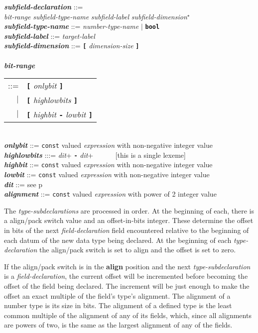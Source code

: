 \documentclass[12pt]{article}
\newcommand{\TT}[1]{{\tt \bfseries #1}}
\newcommand{\STAR}{{\Large $^\star$}}
\newcommand{\key}[1]{{\rm \bfseries #1}}
\newcommand{\emkey}[1]{{\em \bfseries #1}}
\newcommand{\pagref}[1]{p\pageref{#1}}
\newenvironment{indpar}[1][0.3in]%
	{\begin{list}{}%
		     {\setlength{\itemsep}{0in}%
		      \setlength{\topsep}{0in}%
		      \setlength{\parsep}{1ex}%
		      \setlength{\labelwidth}{#1}%
		      \setlength{\leftmargin}{#1}%
		      \addtolength{\leftmargin}{\labelsep}}%
	 \item}%
	{\end{list}}
\begin{document}
\begin{indpar}
\emkey{subfield-declaration} ::= \\
\hspace*{0.5in}
    {\em bit-range} {\em subfield-type-name} {\em subfield-label}
    		{\em subfield-dimension}\STAR{} \\
\emkey{subfield-type-name}\label{SUBFIELD-TYPE-NAME} ::=
    {\em number-type-name} $|$ \TT{bool} \\
\emkey{subfield-label}\label{SUBFIELD-LABEL} ::=  {\em target-label} \\
\emkey{subfield-dimension} ::=  \TT{[} {\em dimension-size} \TT{]} \\
\\[2ex]
\emkey{bit-range}
    \begin{tabular}[t]{@{}rl}
    ::= &  \TT{[} {\em onlybit} \TT{]} \\
    $|$ &  \TT{[} {\em highlowbits} \TT{]} \\
    $|$ &  \TT{[} {\em highbit} \TT{-} {\em lowbit} \TT{]}
    \end{tabular} \\
\emkey{onlybit} ::= {\tt const} valued {\em expression}
		    with non-negative integer value \\
\emkey{highlowbits} :::= {\em dit}+ \TT{-} {\em dit}+
           ~~~~~ [this is a single lexeme] \\
\emkey{highbit} ::= {\tt const} valued {\em expression}
		    with non-negative integer value \\
\emkey{lowbit} ::= {\tt const} valued {\em expression}
		   with non-negative integer value \\
\emkey{dit} ::= see \pagref{DIT}
\\[2ex]
\emkey{alignment} ::= {\tt const} valued {\em expression}
		      with power of 2 integer value
\end{indpar}

The {\em type-subdeclarations} are processed in order.  At the
beginning of each, there is a align/pack switch value and an
offset-in-bits integer.  These determine the offset in bits
of the next {\em field-declaration} field encountered
relative to the beginning of each datum of the new data
type being declared.  At the beginning of each {\em type-declaration}
the align/pack switch is set to align and the offset is set to zero.

If the align/pack switch is in the \key{align} position and the
next {\em type-subdeclaration} is a {\em field-declaration}, the
current offset will be incremented before becoming the offset
of the field being declared.  The increment will be just enough
to make the offset an exact multiple of the field's type's alignment.
The alignment of a number type is its size in bits.  The alignment
of a defined type is the least common multiple of the alignment of
any of its fields, which, since all alignments are powers of two,
is the same as the largest alignment of any of the fields.
\end{document}
